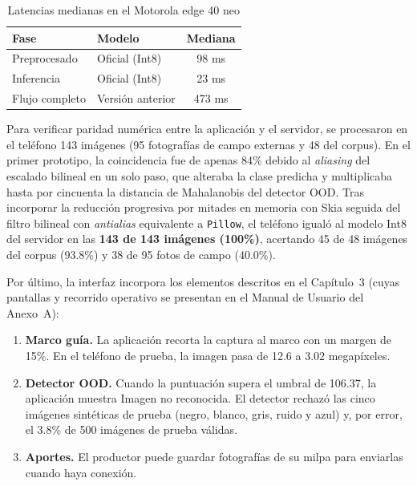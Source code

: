 \begin{table}[H]
\caption{Latencias medianas en el Motorola edge 40 neo}
\label{tab:latencias_movil_c3}
\centering
\small
\begin{singlespace}
\begin{tabular}{llc}
\toprule
\textbf{Fase} & \textbf{Modelo} & \textbf{Mediana} \\
\midrule
Preprocesado & Oficial (Int8) & 98 ms \\
Inferencia & Oficial (Int8) & 23 ms \\
Flujo completo & Versi\'on anterior & 473 ms \\
\bottomrule
\end{tabular}
\end{singlespace}
\end{table}

Para verificar paridad num\'erica entre la aplicaci\'on y el servidor, se procesaron en el tel\'efono 143 im\'agenes (95 fotograf\'ias de campo externas y 48 del corpus). En el primer prototipo, la coincidencia fue de apenas 84\% debido al \textit{aliasing} del escalado bilineal en un solo paso, que alteraba la clase predicha y multiplicaba hasta por cincuenta la distancia de Mahalanobis del detector OOD. Tras incorporar la reducci\'on progresiva por mitades en memoria con Skia seguida del filtro bilineal con \textit{antialias} equivalente a \texttt{Pillow}, el tel\'efono igual\'o al modelo Int8 del servidor en las \textbf{143 de 143 im\'agenes (100\%)}, acertando 45 de 48 im\'agenes del corpus (93.8\%) y 38 de 95 fotos de campo (40.0\%).

Por \'ultimo, la interfaz incorpora los elementos descritos en el Cap\'itulo~3 (cuyas pantallas y recorrido operativo se presentan en el Manual de Usuario del Anexo~A):
\begin{enumerate}
\item \textbf{Marco gu\'ia.} La aplicaci\'on recorta la captura al marco con un margen de 15\%. En el tel\'efono de prueba, la imagen pasa de 12.6 a 3.02 megap\'ixeles.
\item \textbf{Detector OOD.} Cuando la puntuaci\'on supera el umbral de 106.37, la aplicaci\'on muestra \guillemotleft Imagen no reconocida\guillemotright. El detector rechaz\'o las cinco im\'agenes sint\'eticas de prueba (negro, blanco, gris, ruido y azul) y, por error, el 3.8\% de 500 im\'agenes de prueba v\'alidas.
\item \textbf{Aportes.} El productor puede guardar fotograf\'ias de su milpa para enviarlas cuando haya conexi\'on.
\end{enumerate}

